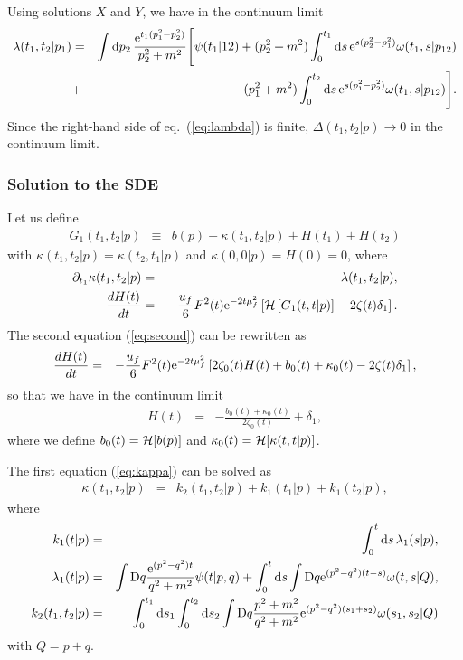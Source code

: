 \documentclass[preprint]{ptephy_v1}%
\newcommand{\rme}{{\rm e}}
\newcommand{\rmd}{{\rm d}}
\newcommand{\rmD}{{\rm D}}
\begin{document}
Using solutions $X$ and $Y$, we have  in the continuum limit
\begin{eqnarray}
\lambda(t_1,t_2\vert p_1) 
&=& \int \rmd p_2\, \frac{\rme^{t_1(p_1^2-p_2^2)}}{p_2^2+m^2}\Biggl[\psi(t_1\vert 12)+(p_2^2+m^2)\int_0^{t_1} \rmd  s\, \rme^{s(p_2^2-p_1^2)}\omega(t_1,s\vert p_{12}) \nonumber \\
&+&(p_1^2+m^2)\int_0^{t_2} \rmd s\, \rme^{s(p_1^2-p_2^2)}\omega(t_1,s\vert p_{12})\Biggr] .
\label{eq:lambda}
\end{eqnarray}
Since the right-hand side of eq.~(\ref{eq:lambda}) is finite,  $\Delta(t_1,t_2\vert p)\rightarrow 0$ in the continuum limit.

\subsubsection{Solution to the SDE}
\label{app:SDE_flow_G1}
Let us define
\begin{eqnarray}
G_1(t_1,t_2\vert p) &\equiv & b(p) + \kappa(t_1,t_2\vert p) + H(t_1) + H(t_2) 
\end{eqnarray}
with $\kappa(t_1,t_2\vert p) = \kappa(t_2,t_1\vert p)$  and $\kappa(0,0\vert p)=H(0)= 0$, where
\begin{eqnarray}
\partial_{t_1}\kappa(t_1,t_2\vert p) &=&\lambda(t_1,t_2\vert p), 
\label{eq:kappa}\\
\frac{d H(t)}{d t} &=& -\frac{u_f}{6}F^2(t)\rme^{-2t\mu_f^2}\left[
  {\cal H}\left[G_1(t,t\vert p)\right]
-2\zeta(t)\delta_1\right].
\label{eq:second}
\end{eqnarray}
The second equation (\ref{eq:second})  can be rewritten as
\begin{eqnarray}
\frac{d H(t)}{d t} &=&  -\frac{u_f}{6}F^2(t)\rme^{-2t\mu_f^2}\left[2\zeta_0(t) H(t) +b_0(t) +\kappa_0(t) -2\zeta(t) \delta_1\right],
\end{eqnarray}
so that we have  in the continuum limit
\begin{eqnarray}
H(t) &=& -\frac{b_0(t)+\kappa_0(t)}{2\zeta_0(t)} +\delta_1,
\end{eqnarray}
where we define $b_0(t) = {\cal H}[b(p)]$ and $ \kappa_0(t) ={\cal H}[\kappa(t,t\vert p)]$.

The first equation (\ref{eq:kappa}) can be solved as
\begin{eqnarray}
\kappa(t_1,t_2\vert p) &=& k_2(t_1,t_2\vert p) + k_1(t_1\vert p)+ k_1(t_2\vert p),
\end{eqnarray}
where
\begin{eqnarray}
k_1(t\vert p) &=& \int_0^t \rmd s\, \lambda_1(s\vert p), 
\label{eq:k1}\\
 \lambda_1(t\vert p) &=& 
 \int \rmD q \frac{\rme^{(p^2-q^2)t}}{q^2+m^2}\psi(t\vert p,q) +
 \int_0^t \rmd s \int \rmD q \rme^{(p^2-q^2)(t-s)} \omega(t,s\vert Q), 
\label{eq:lambda1} \\
 k_2(t_1,t_2\vert p) &=& \int_0^{t_1} \rmd s_1\int_0^{t_2} \rmd s_2 \int \rmD q \frac{p^2+m^2}{q^2+m^2} \rme^{(p^2-q^2)(s_1+s_2)}\omega(s_1,s_2\vert Q)
 \label{eq:k2}
\end{eqnarray}
with $Q=p+q$. 
\end{document}
